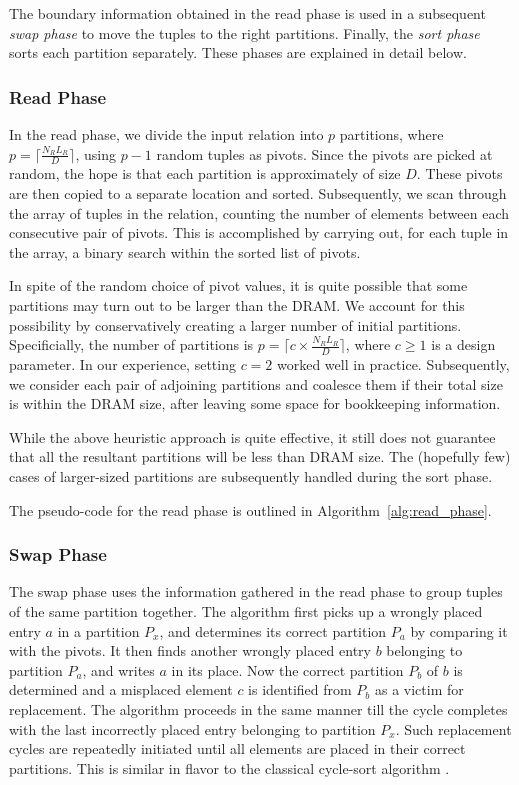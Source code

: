 The boundary information obtained in the read phase is used in
a subsequent \emph{swap phase} to move the tuples to the right
partitions. Finally, the \emph{sort phase} sorts each partition
separately. These phases are explained in detail below.

\subsubsection{Read Phase} 
In the read phase, we divide the input relation into $p$ partitions,
where $p = \lceil \frac{N_R L_R}{D} \rceil$, using $p-1$ random tuples
as pivots.  Since the pivots are picked at random, the hope is that each
partition is approximately of size $D$.  These pivots are then copied
to a separate location and sorted. Subsequently, we scan through the
array of tuples in the relation, counting the number of elements between
each consecutive pair of pivots. This is accomplished by carrying out, for each
tuple in the array, a binary search within the sorted list of pivots.

In spite of the random choice of pivot values, it is quite possible that
some partitions may turn out to be larger than the DRAM. We account
for this possibility by conservatively creating a larger number of
initial partitions. Specificially, the number of partitions is $p =
\lceil c \times \frac{N_R L_R}{D} \rceil$, where $c \geq 1$ is a design
parameter. In our experience, setting $c = 2$ worked well in practice.
Subsequently, we consider each pair of adjoining partitions and coalesce
them if their total size is within the DRAM size, after leaving some space
for bookkeeping information. 

While the above heuristic approach is quite effective, it still does not
guarantee that all the resultant partitions will be less than DRAM size. The
(hopefully few) cases of larger-sized partitions are subsequently handled
during the sort phase.

The pseudo-code for the read phase is outlined in
Algorithm~\ref{alg:read_phase}.



\subsubsection{Swap Phase} 
The swap phase uses the information gathered in the read phase to group
tuples of the same partition together. The algorithm first picks up
a wrongly placed entry $a$ in a partition $P_x$, and determines its
correct partition $P_a$ by comparing it with the pivots. It then finds
another wrongly placed entry $b$ belonging to partition $P_a$, and writes
$a$ in its place. Now the correct partition $P_b$ of $b$ is determined
and a misplaced element $c$ is identified from $P_b$ as a victim for
replacement. The algorithm proceeds in the same manner till the cycle
completes with the last incorrectly placed entry belonging to partition
$P_x$. Such replacement cycles are repeatedly initiated until all
elements are placed in their correct partitions. This is similar in
flavor to the classical cycle-sort algorithm \cite{cycle_sort}.

